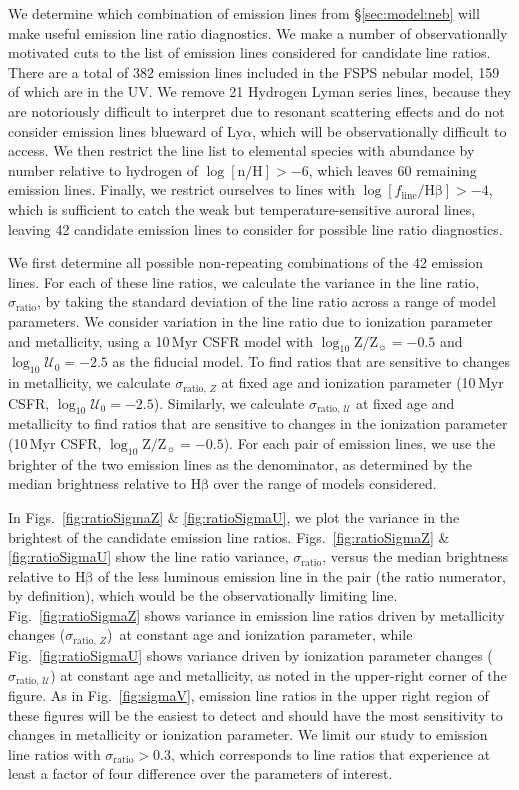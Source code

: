 \documentclass[preprint2,trackchanges]{aastex62}
\newcommand{\FSPS}{{\sc FSPS}\xspace}
\newcommand{\sigmaR}{\ensuremath{\sigma_{\mathrm{ratio}}}\xspace}
\newcommand{\sigmaRU}{\ensuremath{\sigma_{\mathrm{ratio,}\,\mathcal{U}}}\xspace}
\newcommand{\sigmaRZ}{\ensuremath{\sigma_{\mathrm{ratio,}\,Z}}\xspace}
\newcommand{\hb}{\ensuremath{\mathrm{H\beta}}\xspace}
\newcommand{\Myr}{$\,$Myr\xspace}
\newcommand{\logten}{\ensuremath{\log_{10}}}
\newcommand{\logZeq}[1]{\ensuremath{\logten \mathrm{Z}/\mathrm{Z}_{\sun} = #1}}
\newcommand{\logUeq}[1]{\ensuremath{\logten \mathcal{U}_0 = #1}}
\begin{document}
We determine which combination of emission lines from \S\ref{sec:model:neb} will make useful emission line ratio diagnostics. We make a number of observationally motivated cuts to the list of emission lines considered for candidate line ratios. There are a total of 382 emission lines included in the \FSPS nebular model, 159 of which are in the UV. We remove 21 Hydrogen Lyman series lines, because they are notoriously difficult to interpret due to resonant scattering effects and do not consider emission lines blueward of Ly$\alpha$, which will be observationally difficult to access. We then restrict the line list to elemental species with abundance by number relative to hydrogen of $\log[ \mathrm{n} / \mathrm{H} ] > -6$, which leaves 60 remaining emission lines. Finally, we restrict ourselves to lines with $\log[ f_{\mathrm{line}} / \hb] > -4$, which is sufficient to catch the weak but temperature-sensitive auroral lines, leaving 42 candidate emission lines to consider for possible line ratio diagnostics.

We first determine all possible non-repeating combinations of the 42 emission lines. For each of these line ratios, we calculate the variance in the line ratio, \sigmaR, by taking the standard deviation of the line ratio across a range of model parameters. We consider variation in the line ratio due to ionization parameter and metallicity, using a 10\Myr CSFR model with \logZeq{-0.5} and \logUeq{-2.5} as the fiducial model. To find ratios that are sensitive to changes in metallicity, we calculate \sigmaRZ at fixed age and ionization parameter (10\Myr CSFR, \logUeq{-2.5}). Similarly, we calculate \sigmaRU at fixed age and metallicity to find ratios that are sensitive to changes in the ionization parameter (10\Myr CSFR, \logZeq{-0.5}). For each pair of emission lines, we use the brighter of the two emission lines as the denominator, as determined by the median brightness relative to \hb over the range of models considered.

In Figs.~\ref{fig:ratioSigmaZ} \& \ref{fig:ratioSigmaU}, we plot the variance in the brightest of the candidate emission line ratios. Figs.~\ref{fig:ratioSigmaZ} \& \ref{fig:ratioSigmaU} show the line ratio variance, \sigmaR, versus the median brightness relative to \hb of the less luminous emission line in the pair (the ratio numerator, by definition), which would be the observationally limiting line. Fig.~\ref{fig:ratioSigmaZ} shows variance in emission line ratios driven by metallicity changes (\sigmaRZ)\ at constant age and ionization parameter, while Fig.~\ref{fig:ratioSigmaU} shows variance driven by ionization parameter changes (\sigmaRU) at constant age and metallicity, as noted in the upper-right corner of the figure. As in Fig.~\ref{fig:sigmaV}, emission line ratios in the upper right region of these figures will be the easiest to detect and should have the most sensitivity to changes in metallicity or ionization parameter. We limit our study to emission line ratios with \sigmaR $> 0.3$, which corresponds to line ratios that experience at least a factor of four difference over the parameters of interest.
\end{document}
